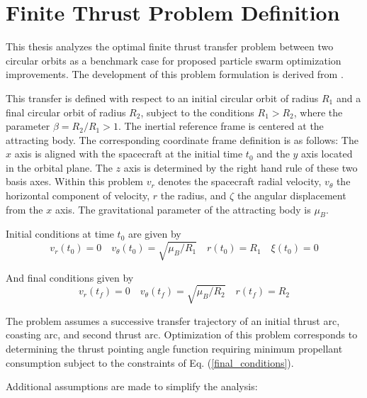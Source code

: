 \section{Finite Thrust Problem Definition}

\noindent This thesis analyzes the optimal finite thrust transfer problem between two circular orbits as a benchmark case for proposed 
particle swarm optimization improvements. The development of this problem formulation is derived from \citep{Pontani_Conway}. \newline

\noindent This transfer is defined with respect to an initial circular orbit of radius $R_1$ and a final circular orbit of radius $R_2$, subject to the conditions $R_1 > R_2$, where the parameter $\beta = R_2/R_1 > 1$. 
The inertial reference frame is centered at the attracting body. The corresponding coordinate frame definition is as follows: The $x$ axis is aligned with the spacecraft at the initial time $t_0$ and the $y$ axis located in the orbital plane.
The $z$ axis is determined by the right hand rule of these two basis axes. Within this problem $v_r$ denotes the spacecraft radial velocity, $v_\theta$ the horizontal component of velocity, $r$ the radius, and $\zeta$ the angular displacement from the $x$ axis. The gravitational
parameter of the attracting body is $\mu_B$. \newline

\noindent Initial conditions at time $t_0$ are given by
\begin{equation}
v_r(t_0) = 0  \quad  v_\theta(t_0) = \sqrt{\mu_B/R_1} \quad r(t_0) = R_1 \quad \xi(t_0) = 0
\label{initial_conditions}
\end{equation}

\noindent And final conditions given by
\begin{equation}
    v_r(t_f) = 0 \quad v_\theta(t_f) = \sqrt{\mu_B/R_2} \quad r(t_f) = R_2
    \label{final_conditions}
\end{equation}

\noindent The problem assumes a successive transfer trajectory of an initial thrust arc, coasting arc, and second thrust arc. 
Optimization of this problem corresponds to determining the thrust pointing angle function requiring minimum propellant consumption 
subject to the constraints of Eq. (\ref{final_conditions}).\newline

\noindent Additional assumptions are made to simplify the analysis:

